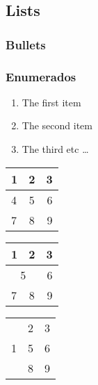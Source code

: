 \documentclass[12pt]{article}  %
\begin{document}
\subsection{Lists}

\subsubsection{Bullets}


\subsubsection{Enumerados}

\begin{enumerate}
  \item The first item
  \item The second item
  \item The third etc \ldots
\end{enumerate}

\begin{tabular}{|  l  | c | r | }
  \hline                       
  1 & 2 & 3 \\ \hline
  4 & 5 & 6 \\ \hline
  7 & 8 & 9 \\
  \hline  
\end{tabular}

\begin{tabular}{|  l  | c | r | }
  \hline                       
  1 & 2 & 3 \\ \hline
  \multicolumn{2}{|c|}{ 5 } & 6 \\ \hline
  7 & 8 & 9 \\ 
  \hline  
\end{tabular}

\begin{tabular}{|  l  | c | r | }
  \hline      
  \multirow{3}{*}{1} & 2 & 3 \\ \cline{2-3}
   & 5 & 6 \\ \cline{2-3}
   & 8 & 9 \\
  \hline  
\end{tabular}
\end{document}

